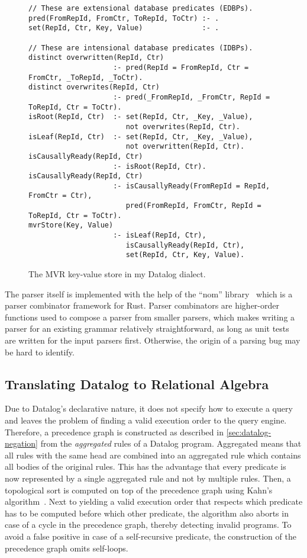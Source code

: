 \begin{figure}[htpb]
	\begin{lstlisting}[keepspaces]
// These are extensional database predicates (EDBPs).
pred(FromRepId, FromCtr, ToRepId, ToCtr) :- .
set(RepId, Ctr, Key, Value)              :- .

// These are intensional database predicates (IDBPs).
distinct overwritten(RepId, Ctr)
                    :- pred(RepId = FromRepId, Ctr = FromCtr, _ToRepId, _ToCtr).
distinct overwrites(RepId, Ctr)
                    :- pred(_FromRepId, _FromCtr, RepId = ToRepId, Ctr = ToCtr).
isRoot(RepId, Ctr)  :- set(RepId, Ctr, _Key, _Value),
                       not overwrites(RepId, Ctr).
isLeaf(RepId, Ctr)  :- set(RepId, Ctr, _Key, _Value),
                       not overwritten(RepId, Ctr).
isCausallyReady(RepId, Ctr)
                    :- isRoot(RepId, Ctr).
isCausallyReady(RepId, Ctr)
                    :- isCausallyReady(FromRepId = RepId, FromCtr = Ctr),
                       pred(FromRepId, FromCtr, RepId = ToRepId, Ctr = ToCtr).
mvrStore(Key, Value)
                    :- isLeaf(RepId, Ctr),
                       isCausallyReady(RepId, Ctr),
                       set(RepId, Ctr, Key, Value).\end{lstlisting}
	\caption{The \ac{MVR} key-value store in my Datalog dialect.}\label{code:mvr-crdt-datalog-dialect}
\end{figure}

The parser itself is implemented with the help of the ``nom'' library~\cite{nom}
which is a parser combinator framework for Rust.
Parser combinators are higher-order functions used to compose a parser
from smaller parsers, which makes writing a parser for an existing grammar
relatively straightforward, as long as unit tests are written for the input
parsers first. Otherwise, the origin of a parsing bug may be hard to identify.

\subsection{Translating Datalog to Relational Algebra}\label{sec:datalog-to-relational-algebra}

Due to Datalog's declarative nature, it does not specify how to execute a query
and leaves the problem of finding a valid execution order to the query engine.
Therefore, a precedence graph is constructed as described in \ref{sec:datalog-negation}
from the \emph{aggregated} rules of a Datalog program.
Aggregated means that all rules with the same head are combined into an
aggregated rule which contains all bodies of the original rules.
This has the advantage that every predicate is now represented by a single
aggregated rule and not by multiple rules.
Then, a topological sort is computed on top of the precedence graph using
Kahn's algorithm~\cite{kahn1962topological}.
Next to yielding a valid execution order that respects which predicate has
to be computed before which other predicate, the algorithm also aborts in
case of a cycle in the precedence graph, thereby detecting invalid programs.
To avoid a false positive in case of a self-recursive predicate,
the construction of the precedence graph omits self-loops.

